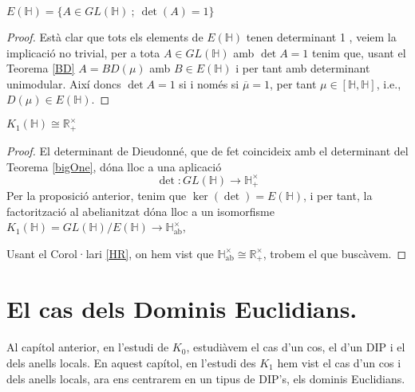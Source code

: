 \begin{prop}
$E(\mathbb{H})=\{A\in GL(\mathbb{H}) \ ; \ \det(A)=1\}$
\end{prop}
\begin{proof}
Està clar que tots els elements de $E(\mathbb{H})$ tenen determinant 1 , veiem la implicació no trivial, per a tota $A\in GL(\mathbb{H})$ amb $\det A = 1$ tenim que, usant el Teorema \ref{BD} $A=BD(\mu)$ amb $B\in E(\mathbb{H})$ i per tant amb determinant unimodular. Així doncs $\det A = 1$ si i només si  $\overline{\mu}=1$, per tant $\mu \in [\mathbb{H},\mathbb{H}]$, i.e., $D(\mu)\in E(\mathbb{H})$.
\end{proof}

\begin{theorem}
$K_1(\mathbb{H})\cong \mathbb{R}^\times_+$
\end{theorem}
\begin{proof}
El determinant de Dieudonné, que de fet coincideix amb el determinant del Teorema \ref{bigOne}, dóna lloc a una aplicació 
$$
\det: GL(\mathbb{H}) \rightarrow \mathbb{H}^\times_+
$$
Per la proposició anterior, tenim que $\ker (\det ) = E(\mathbb{H})$, i per tant, la factorització al abelianitzat dóna lloc a un isomorfisme $K_1(\mathbb{H})= GL(\mathbb{H})/E(\mathbb{H})\rightarrow \mathbb{H}^\times_\text{ab}$, 
\begin{center}
	\end{center}
	Usant el Corol·lari \ref{HR}, on hem vist que $ \mathbb{H}^\times_\text{ab} \cong \mathbb{R}_+^\times$, trobem el que buscàvem.
\end{proof}

\section{El cas dels Dominis Euclidians.}
Al capítol anterior, en l'estudi de $K_0$, estudiàvem el cas d'un cos, el d'un DIP i el dels anells locals. En aquest capítol, en l'estudi des $K_1$ hem vist el cas d'un cos i dels anells locals, ara ens centrarem en un tipus de DIP's, els dominis Euclidians. 

